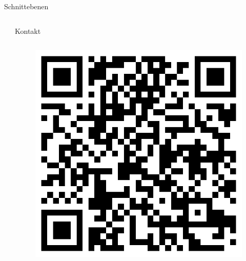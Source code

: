 \documentclass[final,hyperref={pdfpagelabels=false}]{beamer}
\begin{document}
\begin{frame}[t]
\begin{columns}[t]
\begin{column}{.465\textwidth}
\begin{block}{Schnittebenen}
     
   
   
\end{block}


\end{column} %



\begin{column}{.025\textwidth}\end{column} %

\end{columns} %


\begin{columns}[t] %

\begin{column}{.025\textwidth}\end{column} %

\begin{column}{.465\textwidth} %


\begin{block}{Kontakt}
\begin{columns}[t]
\begin{column}{.4\textwidth}
\begin{figure}[h]
\centering
\includegraphics[width=.9\textwidth]{qrcode}
\vspace*{9mm}
\end{figure}
\end{column}




\end{columns}
\end{block}
\end{column}
\end{columns}
\end{frame}
\end{document}
